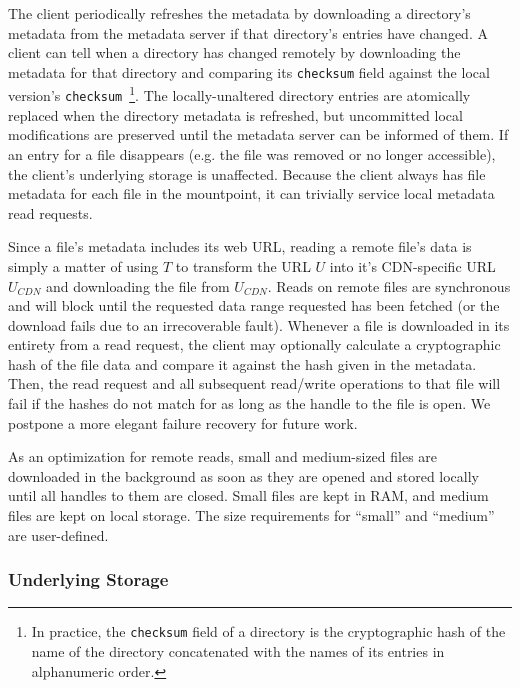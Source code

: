 The client periodically refreshes the metadata by downloading a
directory's metadata from the metadata server if that directory's
entries have changed.  A client can tell when a directory has changed remotely
by downloading the metadata for that directory and comparing its \texttt{checksum} field
against the local version's \texttt{checksum}~\footnote{In practice, the \texttt{checksum} field
of a directory is the cryptographic hash of the name of the directory concatenated with
the names of its entries in alphanumeric order.}.  The locally-unaltered directory entries
are atomically replaced when the directory metadata is refreshed, but uncommitted
local modifications are preserved until the metadata server can be informed of them.
If an entry for a file disappears (e.g. the file was removed or no longer accessible),
the client's underlying storage is unaffected.
Because the client always has file
metadata for each file in the mountpoint, it can trivially service
local metadata read requests.

Since a file's metadata includes its web URL, reading a remote file's
data is simply a matter of using $T$ to transform the URL $U$ into
it's CDN-specific URL $U_{CDN}$ and downloading the file from $U_{CDN}
$.  Reads on remote files are synchronous and will block until the
requested data range requested has been fetched (or the download fails
due to an irrecoverable fault).  Whenever a file is downloaded in its
entirety from a read request, the client may optionally calculate a
cryptographic hash of the file data and compare it against the hash
given in the metadata. Then, the read request and all subsequent
read/write operations to that file will fail if the hashes do not
match for as long as the handle to the file is open.  We postpone a more elegant
failure recovery for future work.

As an optimization for remote reads, small and medium-sized files are
downloaded in the background as soon as they are opened and stored
locally until all handles to them are closed. Small files are kept in
RAM, and medium files are kept on local storage.  The size requirements
for ``small'' and ``medium'' are user-defined.


\subsubsection{Underlying Storage}

